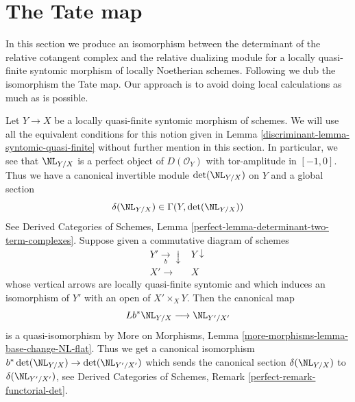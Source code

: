 \section{The Tate map}
\label{discriminant-section-tate-map}
In this section we produce an isomorphism between
the determinant of the relative cotangent complex and
the relative dualizing module for a locally quasi-finite
syntomic morphism of locally Noetherian schemes. Following
\cite[1.4.4]{Garel} we dub the isomorphism the Tate map.
Our approach is to avoid doing local calculations as
much as is possible.

\medskip\noindent
Let $Y \to X$ be a locally quasi-finite syntomic morphism of schemes.
We will use all the equivalent conditions for this notion given in
Lemma \ref{discriminant-lemma-syntomic-quasi-finite} without further mention in
this section. In particular, we see that $\NL_{Y/X}$ is a perfect
object of $D(\mathcal{O}_Y)$ with tor-amplitude in $[-1, 0]$. Thus
we have a canonical invertible module
$\det(\NL_{Y/X})$ on $Y$ and a global section
$$
\delta(\NL_{Y/X}) \in \Gamma(Y, \det(\NL_{Y/X}))
$$
See Derived Categories of Schemes, Lemma
\ref{perfect-lemma-determinant-two-term-complexes}.
Suppose given a commutative diagram of schemes
$$
\begin{array}{cc}Y' \underset{b}{\longrightarrow}\downarrow & Y \downarrow \\ X' \longrightarrow & X\end{array}
$$
whose vertical arrows are locally quasi-finite syntomic and which
induces an isomorphism of $Y'$ with an open of $X' \times_X Y$.
Then the canonical map
$$
Lb^*\NL_{Y/X} \longrightarrow \NL_{Y'/X'}
$$
is a quasi-isomorphism by
More on Morphisms, Lemma \ref{more-morphisms-lemma-base-change-NL-flat}.
Thus we get a canonical isomorphism
$b^*\det(\NL_{Y/X}) \to \det(\NL_{Y'/X'})$ which sends the
canonical section $\delta(\NL_{Y/X})$ to $\delta(\NL_{Y'/ X'})$, see
Derived Categories of Schemes, Remark \ref{perfect-remark-functorial-det}.

